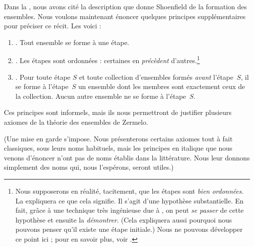 \documentclass[../../../include/open-logic-section]{subfiles}
\begin{document}
	
Dans la , nous avons cité la description
que donne Shoenfield de la formation des ensembles. Nous voulons
maintenant énoncer quelques principes supplémentaires pour préciser
ce récit. Les voici :
\begin{enumerate}
\item[] \stageshier. Tout ensemble se forme à une étape.
\item[] \stagesord. Les étapes sont ordonnées : certaines en
\emph{précèdent} d'autres.\footnote{Nous supposerons en réalité,
tacitement, que les étapes sont \emph{bien ordonnées}. La
 expliquera ce que cela signifie. Il s'agit
d'une hypothèse substantielle. En fait, grâce à une technique très
ingénieuse due à \citet{Scott1974}, on peut \emph{se passer} de cette
hypothèse et ensuite la \emph{démontrer}. (Cela expliquera aussi
pourquoi nous pouvons penser qu'il existe une étape initiale.) Nous
ne pouvons développer ce point ici ; pour en savoir plus, voir
\citet{ButtonLT1}.}
\item[] \stagesacc. Pour toute étape $S$ et toute collection
d'ensembles formés \emph{avant} l'étape~$S$, il se forme à l'étape~$S$
un ensemble dont les membres sont exactement ceux de la collection.
Aucun autre ensemble ne se forme à l'étape~$S$.
\end{enumerate}
Ces principes sont informels, mais ils nous permettront de justifier
plusieurs axiomes de la théorie des ensembles de Zermelo.

(Une mise en garde s'impose. Nous présenterons certains axiomes tout
à fait classiques, sous leurs noms habituels, mais les principes en
italique que nous venons d'énoncer n'ont pas de noms établis dans la
littérature. Nous leur donnons simplement des noms qui, nous
l'espérons, seront utiles.)
\end{document}
